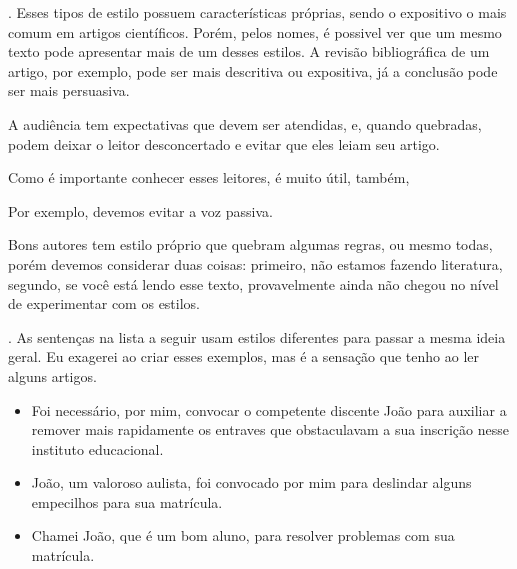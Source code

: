 \documentclass[openany]{book}
\begin{document}
\citep{jeffrey:2016}. Esses tipos de estilo possuem características próprias, sendo o expositivo o mais comum em artigos científicos. Porém, pelos nomes, é possivel ver que um mesmo texto pode apresentar mais de um desses estilos. A revisão bibliográfica de um artigo, por exemplo, pode ser mais descritiva ou expositiva, já a  conclusão  pode ser mais persuasiva.

 A audiência tem expectativas que devem ser atendidas, e, quando quebradas, podem deixar o leitor desconcertado e evitar que eles leiam seu artigo.

Como é importante conhecer esses leitores, é muito útil, também, 

 Por exemplo, devemos evitar  a voz passiva.

Bons autores tem estilo próprio que quebram algumas regras, ou mesmo todas, porém devemos considerar duas coisas: primeiro, não estamos fazendo literatura, segundo, se você está lendo esse texto, provavelmente ainda não chegou no nível de experimentar com os estilos.

. As sentenças na lista a seguir usam estilos diferentes para passar a mesma ideia geral. Eu exagerei ao criar esses exemplos, mas é a sensação que tenho ao ler alguns artigos.
\begin{itemize}
    \item Foi necessário, por mim, convocar o competente discente João para auxiliar a remover mais rapidamente os entraves que obstaculavam a sua inscrição nesse instituto educacional.
    \item João, um valoroso aulista, foi convocado por mim para deslindar alguns empecilhos para sua matrícula.
    \item Chamei João, que é um bom aluno, para resolver problemas com sua matrícula.
\end{itemize}
\end{document}
